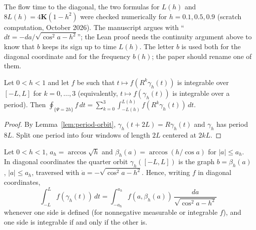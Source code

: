 \begin{remark}
The flow time to the diagonal, the two formulas for $L(h)$ and $8L(h)=4\mathbf K(1-h^2)$
were checked numerically for $h=0.1,0.5,0.9$ (scratch computation, October 2026).
The manuscript argues with ``$dt=-da/\sqrt{\cos^2a-h^2}$''; the Lean proof needs
the continuity argument above to know that $b$ keeps its sign up to time
$L(h)$. The letter $b$ is used both for the diagonal coordinate and for the
frequency $b(h)$; the paper should rename one of them.
\end{remark}

\begin{lemma}
\label{lem:quarter-orbit-decomposition}
\leanok
Let $0<h<1$ and let $f$ be such that $t\mapsto f(R^k\gamma_h(t))$ is integrable over $[-L,L]$ for
$k=0,\dots,3$ (equivalently, $t\mapsto f(\gamma_h(t))$ is integrable over a period).
Then $\oint_{\{\Psi=2h\}}f\,dt=\sum_{k=0}^{3}\int_{-L(h)}^{L(h)}f(R^k\gamma_h(t))\,dt$.
\end{lemma}

\begin{proof}
\leanok
By Lemma~\ref{lem:period-orbit}, $\gamma_h(t+2L)=R\gamma_h(t)$ and $\gamma_h$ has period $8L$.
Split one period into four windows of length $2L$ centered at $2kL$.
\end{proof}

\begin{lemma}
\label{lem:quarter-orbit-diagonal}
\leanok
Let $0<h<1$, $a_h=\arccos\sqrt h$ and $\beta_h(a)=\arccos(h/\cos a)$ for $|a|\le a_h$. In
diagonal coordinates the quarter orbit $\gamma_h([-L,L])$ is the graph $b=\beta_h(a)$,
$|a|\le a_h$, traversed with $\dot a=-\sqrt{\cos^2a-h^2}$. Hence, writing $f$ in diagonal
coordinates,
\[
  \int_{-L}^{L}f(\gamma_h(t))\,dt=\int_{-a_h}^{a_h}f(a,\beta_h(a))\,\frac{da}{\sqrt{\cos^2a-h^2}}
\]
whenever one side is defined (for nonnegative measurable or integrable $f$), and one side is
integrable if and only if the other is.
\end{lemma}

